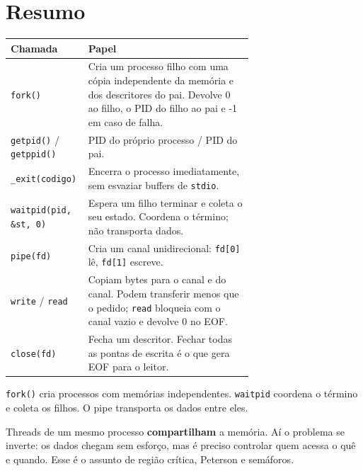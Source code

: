\documentclass[11pt,a4paper]{article}
\newcommand{\cmd}[1]{\texttt{#1}}
\begin{document}
\section{Resumo}

\begin{center}
\begin{tabular}{@{}lp{0.68\linewidth}@{}}
\toprule
\textbf{Chamada} & \textbf{Papel} \\
\midrule
\cmd{fork()} & Cria um processo filho com uma cópia independente da memória e dos descritores do pai. Devolve 0 ao filho, o PID do filho ao pai e -1 em caso de falha. \\
\cmd{getpid()} / \cmd{getppid()} & PID do próprio processo / PID do pai. \\
\cmd{\_exit(codigo)} & Encerra o processo imediatamente, sem esvaziar buffers de \cmd{stdio}. \\
\cmd{waitpid(pid, \&st, 0)} & Espera um filho terminar e coleta o seu estado. Coordena o término; não transporta dados. \\
\cmd{pipe(fd)} & Cria um canal unidirecional: \cmd{fd[0]} lê, \cmd{fd[1]} escreve. \\
\cmd{write} / \cmd{read} & Copiam bytes para o canal e do canal. Podem transferir menos que o pedido; \cmd{read} bloqueia com o canal vazio e devolve 0 no EOF. \\
\cmd{close(fd)} & Fecha um descritor. Fechar todas as pontas de escrita é o que gera EOF para o leitor. \\
\bottomrule
\end{tabular}
\end{center}

\begin{definicao}
\cmd{fork()} cria processos com memórias independentes. \cmd{waitpid} coordena o término e coleta os filhos. O pipe transporta os dados entre eles.
\end{definicao}

\begin{exemplo}
Threads de um mesmo processo \textbf{compartilham} a memória. Aí o problema se inverte: os dados chegam sem esforço, mas é preciso controlar quem acessa o quê e quando. Esse é o assunto de região crítica, Peterson e semáforos.
\end{exemplo}

\end{document}
